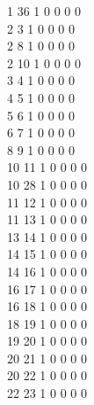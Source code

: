 \documentclass[11pt,titlepage,dvipdfmx,twoside]{jarticle}
\begin{document}
\begin{oframed}
{  1 36  1  0  0  0  0                                                   \\
  2  3  1  0  0  0  0                                                   \\
  2  8  1  0  0  0  0                                                   \\
  2 10  1  0  0  0  0                                                   \\
  3  4  1  0  0  0  0                                                   \\
  4  5  1  0  0  0  0                                                   \\
  5  6  1  0  0  0  0                                                   \\
  6  7  1  0  0  0  0                                                   \\
  8  9  1  0  0  0  0                                                   \\
 10 11  1  0  0  0  0                                                   \\
 10 28  1  0  0  0  0                                                   \\
 11 12  1  0  0  0  0                                                   \\
 11 13  1  0  0  0  0                                                   \\
 13 14  1  0  0  0  0                                                   \\
 14 15  1  0  0  0  0                                                   \\
 14 16  1  0  0  0  0                                                   \\
 16 17  1  0  0  0  0                                                   \\
 16 18  1  0  0  0  0                                                   \\
 18 19  1  0  0  0  0                                                   \\
 19 20  1  0  0  0  0                                                   \\
 20 21  1  0  0  0  0                                                   \\
 20 22  1  0  0  0  0                                                   \\
 22 23  1  0  0  0  0                                                   \\
}
\end{oframed}
\end{document}
